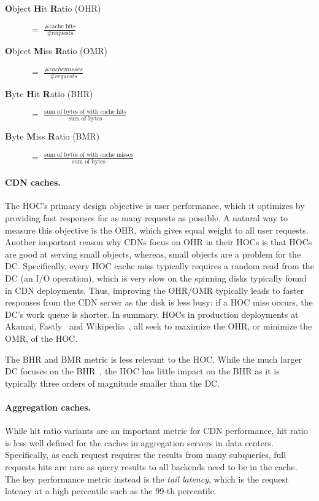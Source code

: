 \documentclass{article}
\begin{document}
\begin{description}
\item[\textbf{O}bject \textbf{H}it \textbf{R}atio (OHR)] $=$ {\Large $\frac{\#\text{cache hits}}{\#\text{requests}}$}
\item[\textbf{O}bject \textbf{M}iss \textbf{R}atio (OMR)] $=$ {\Large $\frac{\#cache misses}{\#requests}$}
\item[\textbf{B}yte \textbf{H}it \textbf{R}atio (BHR)] $=$ {\Large $\frac{\text{sum of bytes of with cache hits}}{\text{sum of bytes}}$}
\item[\textbf{B}yte \textbf{M}iss \textbf{R}atio (BMR)] $=$ {\Large $\frac{\text{sum of bytes of with cache misses}}{\text{sum of bytes}}$}
\end{description}

\paragraph{CDN caches.}
The HOC's primary design objective is user performance, which it optimizes by providing fast responses for as many requests as possible.
A natural way to measure this objective is the OHR, which gives equal weight to all user requests.
Another important reason why CDNs focus on OHR in their HOCs is that HOCs are good at serving small objects, whereas, small objects are a problem for the DC.
Specifically, every HOC cache miss typically requires a random read from the DC (an I/O operation), which is very slow on the spinning disks typically found in CDN deployments.
Thus, improving the OHR/OMR typically leads to faster responses from the CDN server as the disk is less busy: if a HOC miss occurs, the DC's work queue is shorter.
In summary, HOCs in production deployments at Akamai, Fastly~\cite{fastly2016} and Wikipedia~\cite{wikivarnish}, all seek to maximize the OHR, or minimize the OMR, of the HOC.

The BHR and BMR metric is less relevant to the HOC.
While the much larger DC focuses on the BHR~\cite{sitaraman2014overlay}, the HOC has little impact on the BHR as it is typically three orders of magnitude smaller than the DC.

\paragraph{Aggregation caches.}
While hit ratio variants are an important metric for CDN performance, hit ratio is less well defined for the caches in aggregation servers in data centers.
Specifically, as each request requires the results from many subqueries, full requests hits are rare as query results to all backends need to be in the cache.
The key performance metric instead is the \emph{tail latency}, which is the request latency at a high percentile such as the 99-th percentile.
\end{document}
